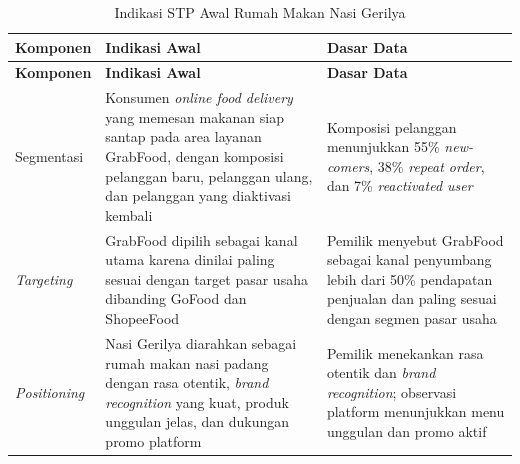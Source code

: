 \begingroup
\begin{xltabular}{\textwidth}{|Z{2.8cm}|Y|Y|}
\caption{Indikasi STP Awal Rumah Makan Nasi Gerilya}
\label{tab:stp_wawancara_awal} \\
        \toprule
        \textbf{Komponen}    & \textbf{Indikasi Awal}                                                                                                                                                                      & \textbf{Dasar Data}                                                                                                          \\ \hline
        \midrule
\endfirsthead
{}
        \toprule
        \textbf{Komponen}    & \textbf{Indikasi Awal}                                                                                                                                                                      & \textbf{Dasar Data}                                                                                                          \\ \hline
        \midrule
\endhead
{}
\endfoot
        \bottomrule
        \endlastfoot
        Segmentasi           & Konsumen \textit{online food delivery} yang memesan makanan siap santap pada area layanan GrabFood, dengan komposisi pelanggan baru, pelanggan ulang, dan pelanggan yang diaktivasi kembali & Komposisi pelanggan menunjukkan 55\% \textit{new-comers}, 38\% \textit{repeat order}, dan 7\% \textit{reactivated user}      \\ \hline
        \textit{Targeting}   & GrabFood dipilih sebagai kanal utama karena dinilai paling sesuai dengan target pasar usaha dibanding GoFood dan ShopeeFood                                                                 & Pemilik menyebut GrabFood sebagai kanal penyumbang lebih dari 50\% pendapatan penjualan dan paling sesuai dengan segmen pasar usaha \\ \hline
        \textit{Positioning} & Nasi Gerilya diarahkan sebagai rumah makan nasi padang dengan rasa otentik, \textit{brand recognition} yang kuat, produk unggulan jelas, dan dukungan promo platform                        & Pemilik menekankan rasa otentik dan \textit{brand recognition}; observasi platform menunjukkan menu unggulan dan promo aktif \\ \hline
        \bottomrule
    
\end{xltabular}
\endgroup

